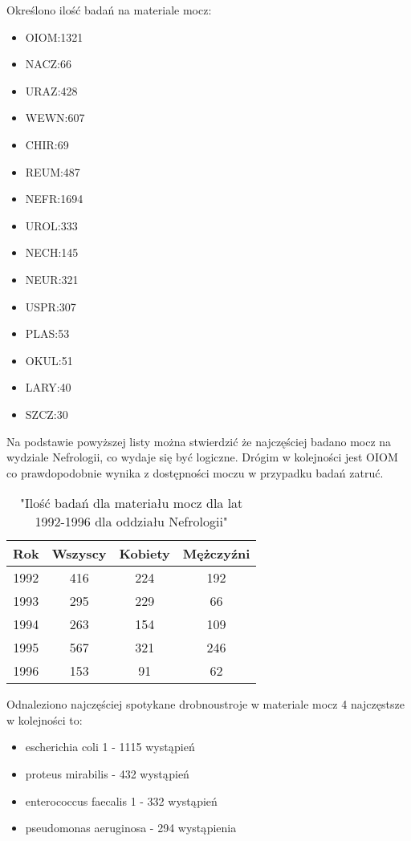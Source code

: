 \documentclass[a4paper,11pt]{article}
\begin{document}
Określono ilość badań na materiale mocz:
\begin{itemize}
\item OIOM:1321
\item NACZ:66
\item URAZ:428
\item WEWN:607
\item CHIR:69
\item REUM:487
\item NEFR:1694
\item UROL:333
\item NECH:145
\item NEUR:321
\item USPR:307
\item PLAS:53
\item OKUL:51
\item LARY:40
\item SZCZ:30
\end{itemize}
Na podstawie powyższej listy można stwierdzić że najczęściej badano mocz na wydziale
 Nefrologii, co wydaje się być logiczne. 
Drógim w kolejności jest OIOM co prawdopodobnie wynika z dostępności moczu w przypadku badań zatruć.  

\begin{table}[h]
  \begin{center}
  \caption{"Ilość badań dla materiału mocz dla lat 1992-1996 dla oddziału Nefrologii"}
  \begin{tabular}{|c|c|c|c|}
    \hline
    Rok & Wszyscy & Kobiety & Mężczyźni \\ \hline
1992 &416 &224 &192\\ \hline
1993 &295 &229 &66\\ \hline
1994 &263 &154 &109\\ \hline
1995 &567 &321 &246\\ \hline
1996 &153 &91 &62\\ \hline
  \end{tabular}
\end{center}
\end{table}


Odnaleziono najczęściej spotykane drobnoustroje w materiale mocz 4 najczęstsze w kolejności to:
\begin{itemize}
\item escherichia coli 1 - 1115 wystąpień
\item proteus mirabilis - 432 wystąpień
\item enterococcus faecalis 1 - 332 wystąpień
\item pseudomonas aeruginosa - 294 wystąpienia
\end{itemize}
\end{document}
